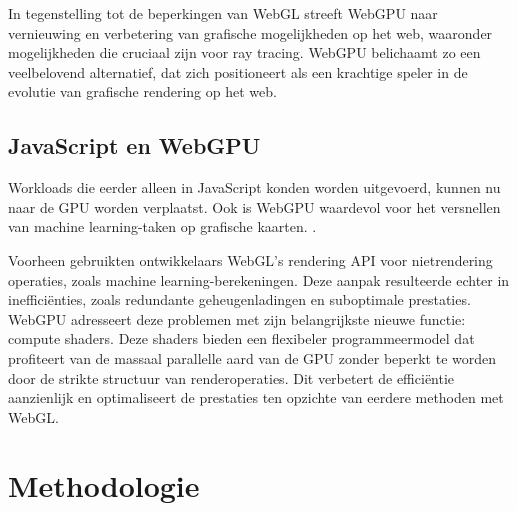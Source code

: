 \bigbreak{}
In tegenstelling tot de beperkingen van WebGL streeft WebGPU naar vernieuwing en verbetering van grafische mogelijkheden op het web, waaronder mogelijkheden die cruciaal zijn voor ray tracing. WebGPU belichaamt zo een veelbelovend alternatief, dat zich positioneert als een krachtige speler in de evolutie van grafische rendering op het web.

\subsection{JavaScript en WebGPU}

Workloads die eerder alleen in JavaScript konden worden uitgevoerd, kunnen nu naar de GPU worden verplaatst. Ook is WebGPU waardevol voor het versnellen van machine learning-taken op grafische kaarten. \autocite{Wallez2023}.

\bigbreak{}
Voorheen gebruikten ontwikkelaars WebGL's rendering API voor niet\-ren\-de\-ring operaties, zoals machine learning-be\-re\-ke\-ning\-en. Deze aanpak resulteerde echter in inefficiënties, zoals redundante geheugenladingen en suboptimale prestaties. WebGPU adresseert deze problemen met zijn belangrijkste nieuwe functie: compute shaders. Deze shaders bieden een flexibeler programmeermodel dat profiteert van de massaal parallelle aard van de GPU zonder beperkt te worden door de strikte structuur van renderoperaties.  Dit verbetert de efficiëntie aanzienlijk en optimaliseert de prestaties ten  opzichte van eerdere methoden met WebGL.

\newpage


\section{Methodologie}%
\label{sec:methodologie}



